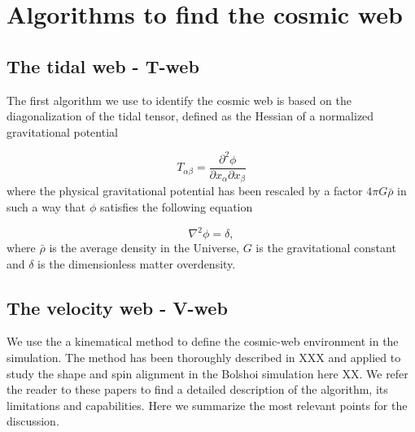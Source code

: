 \documentclass[usenatbib]{latex/mn2e}
\begin{document}
\section{Algorithms to find the cosmic web}
\label{sec:algorithms_cosmic_web}

\subsection{The tidal web - T-web}
\label{subsec:Tweb}


The first algorithm  we use to identify the cosmic web is based on the
diagonalization of the tidal tensor, defined as the Hessian of a 
normalized gravitational potential  


\begin{equation}
T_{\alpha\beta} = \frac{\partial^2\phi}{\partial x_{\alpha}\partial x_{\beta}}
\end{equation}
where the physical gravitational potential has been rescaled by a factor 
$4\pi G\bar{\rho}$ in such a way that $\phi$ satisfies the following 
equation


\begin{equation}
\nabla^2\phi = \delta,
\end{equation}
where $\bar{\rho}$ is the average density in the Universe, $G$ is the 
gravitational constant and $\delta$ is the dimensionless matter 
overdensity.


\subsection{The velocity  web - V-web}
\label{sec:Vweb}


We use the a kinematical method to define the cosmic-web environment in 
the simulation. The method has been thoroughly described in XXX and 
applied to study the shape and spin alignment in the Bolshoi simulation 
here XX. We refer the reader to these papers to find a detailed 
description of the algorithm, its limitations and capabilities. Here we 
summarize the most relevant points for the discussion. 
\end{document}
